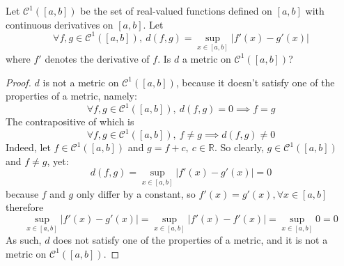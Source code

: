 \documentclass{article}
\newcommand{\abs}[1]{\left|#1\right|}
\newcommand{\parens}[1]{\left(#1\right)}
\newcommand{\sqbracks}[1]{\left[#1\right]}
\newcommand{\R}{\mathbb{R}}
\begin{document}
	\item Let $\mathcal{C}^1\parens{\sqbracks{a,b}}$ be the set of real-valued functions defined on $\sqbracks{a,b}$ with continuous derivatives on $\sqbracks{a,b}$. Let
	$$\forall f,g \in \mathcal{C}^1\parens{\sqbracks{a,b}},\ d\parens{f,g} = \sup_{x\in\sqbracks{a,b}}\abs{f'(x) - g'(x)}$$
	where $f'$ denotes the derivative of $f$. Is $d$ a metric on $\mathcal{C}^1\parens{\sqbracks{a,b}}$?
	\begin{proof}
	$d$ is not a metric on $\mathcal{C}^1\parens{\sqbracks{a,b}}$, because it doesn't satisfy one of the properties of a metric, namely:
	$$\forall f,g \in \mathcal{C}^1\parens{\sqbracks{a,b}},\ d(f,g) = 0 \implies f=g$$
	The contrapositive of which is
	$$\forall f,g \in \mathcal{C}^1\parens{\sqbracks{a,b}},\ f\neq g \implies d(f,g)\neq 0$$ 
	Indeed, let $f \in \mathcal{C}^1\parens{\sqbracks{a,b}}$ and $g = f + c,\ c \in \R$. So clearly, $g \in \mathcal{C}^1\parens{\sqbracks{a,b}}$ and $f \neq g$, yet:
	$$d(f,g) = \sup_{x\in[a,b]}\abs{f'(x) - g'(x)} = 0$$
	because $f$ and $g$ only differ by a constant, so $f'(x) = g'(x), \forall x \in[a,b]$ therefore	
	$$\sup_{x\in[a,b]}\abs{f'(x) - g'(x)} = \sup_{x\in[a,b]}\abs{f'(x) - f'(x)} = \sup_{x\in[a,b]}0 = 0$$
	As such, $d$ does not satisfy one of the properties of a metric, and it is not a metric on $\mathcal{C}^1\parens{\sqbracks{a,b}}$. 
	\end{proof}
	
\end{document}
